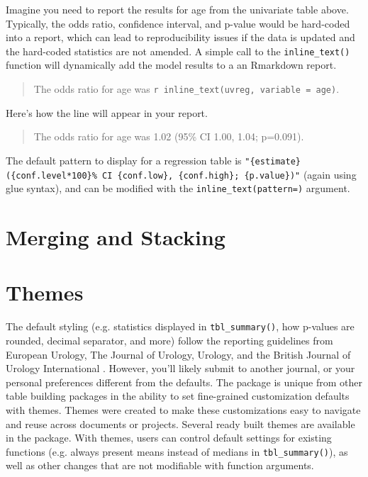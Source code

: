 Imagine you need to report the results for age from the univariate table above.
Typically, the odds ratio, confidence interval, and p-value would be hard-coded into a report, which can lead to reproducibility issues if the data is updated and the hard-coded statistics are not amended.
A simple call to the \texttt{inline\_text()} function will dynamically add the model results to a an Rmarkdown report.

\begin{quote}
The odds ratio for age was \texttt{\textasciigrave{}r\ inline\_text(uvreg,\ variable\ =\ age)\textasciigrave{}}.
\end{quote}

Here's how the line will appear in your report.

\begin{quote}
The odds ratio for age was 1.02 (95\% CI 1.00, 1.04; p=0.091).
\end{quote}

The default pattern to display for a regression table is \texttt{"\{estimate\} (\{conf.level*100\}\% CI \{conf.low\}, \{conf.high\}; \{p.value\})"} (again using glue syntax), and can be modified with the \texttt{inline\_text(pattern=)} argument. 

\section{Merging and Stacking}

\section{Themes}

The default styling (e.g. statistics displayed in \texttt{tbl\_summary()}, how p-values are rounded, decimal separator, and more) follow the reporting guidelines from European Urology, The Journal of Urology, Urology, and the British Journal of Urology International \citep{assel2019guidelines}.
However, you'll likely submit to another journal, or your personal preferences different from the defaults.
The  package is unique from other table building packages in the ability to set fine-grained customization defaults with themes. 
Themes were created to make these customizations easy to navigate and reuse across documents or projects. 
Several ready built themes are available in the package.
With themes, users can control default settings for existing functions (e.g. always present means instead of medians in \texttt{tbl\_summary()}), as well as other changes that are not modifiable with function arguments.

